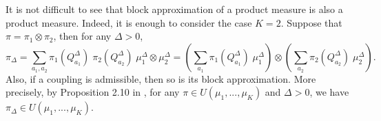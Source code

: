 It is not difficult to see that block approximation of a product measure is also a product measure. Indeed, it is enough to consider the case
$K=2$. Suppose that $\pi = \pi_1 \otimes \pi_2$, then for any $\Delta > 0$,
\begin{equation}
  \pi_{\Delta} = \sum_{a_1, a_2}
  \pi_1(Q^{\Delta}_{a_1}) \; \pi_2(Q^{\Delta}_{a_2}) \; \mu_1^{\Delta} \otimes \mu_2^{\Delta} =
  \left( \sum_{a_1} \pi_1(Q^{\Delta}_{a_1}) \; \mu_1^{\Delta} \right) \otimes
  \left( \sum_{a_2} \pi_2(Q^{\Delta}_{a_2}) \; \mu_2^{\Delta} \right).
\end{equation}
Also, if a coupling is admissible, then so is its block approximation. More precisely,
by Proposition 2.10 in \citep{Carlier17}, for any $\pi \in U(\mu_1, ..., \mu_K)$ and $\Delta > 0$,
we have $\pi_{\Delta} \in U(\mu_1, ..., \mu_K)$.

